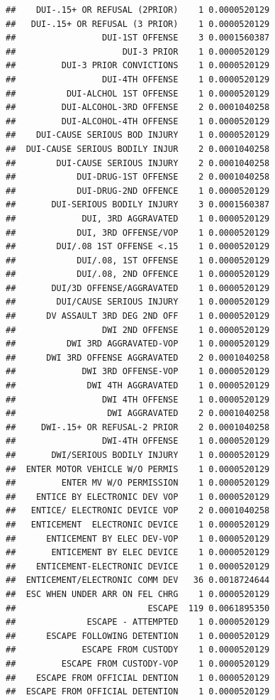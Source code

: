 \documentclass[]{book}
\begin{document}
\begin{verbatim}
##    DUI-.15+ OR REFUSAL (2PRIOR)    1 0.0000520129
##   DUI-.15+ OR REFUSAL (3 PRIOR)    1 0.0000520129
##                 DUI-1ST OFFENSE    3 0.0001560387
##                     DUI-3 PRIOR    1 0.0000520129
##         DUI-3 PRIOR CONVICTIONS    1 0.0000520129
##                 DUI-4TH OFFENSE    1 0.0000520129
##          DUI-ALCHOL 1ST OFFENSE    1 0.0000520129
##         DUI-ALCOHOL-3RD OFFENSE    2 0.0001040258
##         DUI-ALCOHOL-4TH OFFENSE    1 0.0000520129
##    DUI-CAUSE SERIOUS BOD INJURY    1 0.0000520129
##  DUI-CAUSE SERIOUS BODILY INJUR    2 0.0001040258
##        DUI-CAUSE SERIOUS INJURY    2 0.0001040258
##            DUI-DRUG-1ST OFFENSE    2 0.0001040258
##            DUI-DRUG-2ND OFFENCE    1 0.0000520129
##       DUI-SERIOUS BODILY INJURY    3 0.0001560387
##             DUI, 3RD AGGRAVATED    1 0.0000520129
##            DUI, 3RD OFFENSE/VOP    1 0.0000520129
##        DUI/.08 1ST OFFENSE <.15    1 0.0000520129
##            DUI/.08, 1ST OFFENSE    1 0.0000520129
##            DUI/.08, 2ND OFFENCE    1 0.0000520129
##       DUI/3D OFFENSE/AGGRAVATED    1 0.0000520129
##        DUI/CAUSE SERIOUS INJURY    1 0.0000520129
##      DV ASSAULT 3RD DEG 2ND OFF    1 0.0000520129
##                 DWI 2ND OFFENSE    1 0.0000520129
##          DWI 3RD AGGRAVATED-VOP    1 0.0000520129
##      DWI 3RD OFFENSE AGGRAVATED    2 0.0001040258
##             DWI 3RD OFFENSE-VOP    1 0.0000520129
##              DWI 4TH AGGRAVATED    1 0.0000520129
##                 DWI 4TH OFFENSE    1 0.0000520129
##                  DWI AGGRAVATED    2 0.0001040258
##     DWI-.15+ OR REFUSAL-2 PRIOR    2 0.0001040258
##                 DWI-4TH OFFENSE    1 0.0000520129
##       DWI/SERIOUS BODILY INJURY    1 0.0000520129
##  ENTER MOTOR VEHICLE W/O PERMIS    1 0.0000520129
##         ENTER MV W/O PERMISSION    1 0.0000520129
##    ENTICE BY ELECTRONIC DEV VOP    1 0.0000520129
##   ENTICE/ ELECTRONIC DEVICE VOP    2 0.0001040258
##   ENTICEMENT  ELECTRONIC DEVICE    1 0.0000520129
##      ENTICEMENT BY ELEC DEV-VOP    1 0.0000520129
##       ENTICEMENT BY ELEC DEVICE    1 0.0000520129
##    ENTICEMENT-ELECTRONIC DEVICE    1 0.0000520129
##  ENTICEMENT/ELECTRONIC COMM DEV   36 0.0018724644
##  ESC WHEN UNDER ARR ON FEL CHRG    1 0.0000520129
##                          ESCAPE  119 0.0061895350
##              ESCAPE - ATTEMPTED    1 0.0000520129
##      ESCAPE FOLLOWING DETENTION    1 0.0000520129
##             ESCAPE FROM CUSTODY    1 0.0000520129
##         ESCAPE FROM CUSTODY-VOP    1 0.0000520129
##    ESCAPE FROM OFFICIAL DENTION    1 0.0000520129
##  ESCAPE FROM OFFICIAL DETENTION    1 0.0000520129

\end{verbatim}
\end{document}
